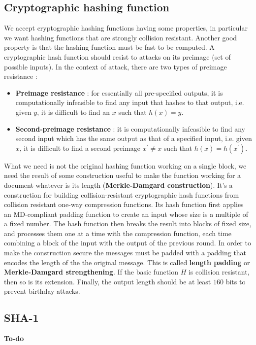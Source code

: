 \documentclass[11pt]{article}
\begin{document}
\subsection{Cryptographic hashing function}
We accept cryptographic hashing functions having some properties, in particular we want hashing functions that are strongly collision resistant. Another good property is that the hashing function must be fast to be computed. A cryptographic hash function should resist to attacks on its preimage (set of possible inputs). In the context of attack, there are two types of preimage resistance :
\begin{itemize}
\item \textbf{Preimage resistance} : for essentially all pre-specified outputs, it is computationally infeasible to find any input that hashes to that output, i.e. given $y$, it is difficult to find an $x$ such that $h(x) = y$.
\item \textbf{Second-preimage resistance} : it is computationally infeasible to find any second input which has the same output as that of a specified input, i.e. given $x$, it is difficult to find a second preimage $x^{'} \neq x$ such that $h(x) = h(x^{'})$.
\end{itemize}
What we need is not the original hashing function working on a single block, we need the result of some construction useful to make the function working
for a document whatever is its length (\textbf{Merkle-Damgard construction}). It's a construction for building collision-resistant cryptographic hash functions from collision resistant one-way compression functions. Its hash function first applies an MD-compliant padding function to create an input whose size is a multiple of a fixed number. The hash function then breaks the result into blocks of fixed size, and processes them one at a time with the compression function, each time combining a block of the input with the output of the previous round. In order to make the construction secure the messages must be padded with a padding that encodes the length of the the original message. This is called \textbf{length padding} or \textbf{Merkle-Damgard strengthening}. If the basic function $H$ is collision resistant, then so is its extension. Finally, the output length should be at least $160$ bits to prevent birthday attacks.
\subsection{SHA-1}
\textbf{To-do}
\end{document}
